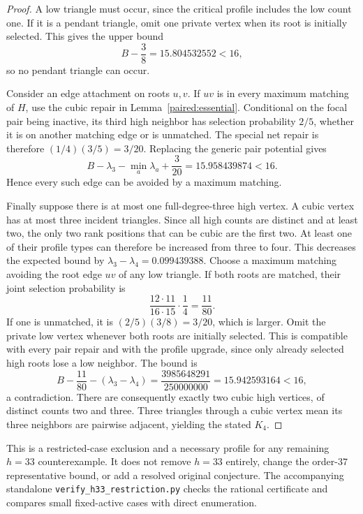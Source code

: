 \documentclass[11pt,a4paper]{article}
\theoremstyle{definition}\newtheorem{definition}[theorem]{Definition}
\theoremstyle{remark}\newtheorem{remark}[theorem]{Remark}
\begin{document}
\begin{proof}
A low triangle must occur, since the critical profile includes the
low count one. If it is a pendant triangle, omit one private vertex
when its root is initially selected. This gives the upper bound
\[
 B-\frac38=15.804532552<16,
\]
so no pendant triangle can occur.

Consider an edge attachment on roots $u,v$. If $uv$ is in every
maximum matching of $H$, use the cubic repair in
Lemma~\ref{paired:essential}. Conditional on the focal pair being
inactive, its third high neighbor has selection probability $2/5$,
whether it is on another matching edge or is unmatched. The special
net repair is therefore $(1/4)(3/5)=3/20$. Replacing the generic
pair potential gives
\[
 B-\lambda_3-\min_a\lambda_a+\frac3{20}
 =15.958439874<16.
\]
Hence every such edge can be avoided by a maximum matching.

Finally suppose there is at most one full-degree-three high vertex.
A cubic vertex has at most three incident triangles. Since all high
counts are distinct and at least two, the only two rank positions
that can be cubic are the first two. At least one of their profile
types can therefore be increased from three to four. This decreases
the expected bound by
$\lambda_3-\lambda_4=0.099439388$.
Choose a maximum matching avoiding the root edge $uv$ of any low
triangle. If both roots are matched, their joint selection probability
is
\[
 \frac{12\cdot11}{16\cdot15}\cdot\frac14=\frac{11}{80}.
\]
If one is unmatched, it is $(2/5)(3/8)=3/20$, which is larger.
Omit the private low vertex whenever both roots are initially selected.
This is compatible with every pair repair and with the profile upgrade,
since only already selected high roots lose a low neighbor. The bound is
\[
 B-\frac{11}{80}-(\lambda_3-\lambda_4)
 =\frac{3985648291}{250000000}=15.942593164<16,
\]
a contradiction. There are consequently exactly two cubic high
vertices, of distinct counts two and three. Three triangles through
a cubic vertex mean its three neighbors are pairwise adjacent, yielding
the stated $K_4$.
\end{proof}

This is a restricted-case exclusion and a necessary profile for any
remaining $h=33$ counterexample. It does not remove $h=33$ entirely,
change the order-$37$ representative bound, or add a resolved original
conjecture. The accompanying standalone
\nolinkurl{verify_h33_restriction.py} checks the rational certificate
and compares small fixed-active cases with direct enumeration.
\end{document}

